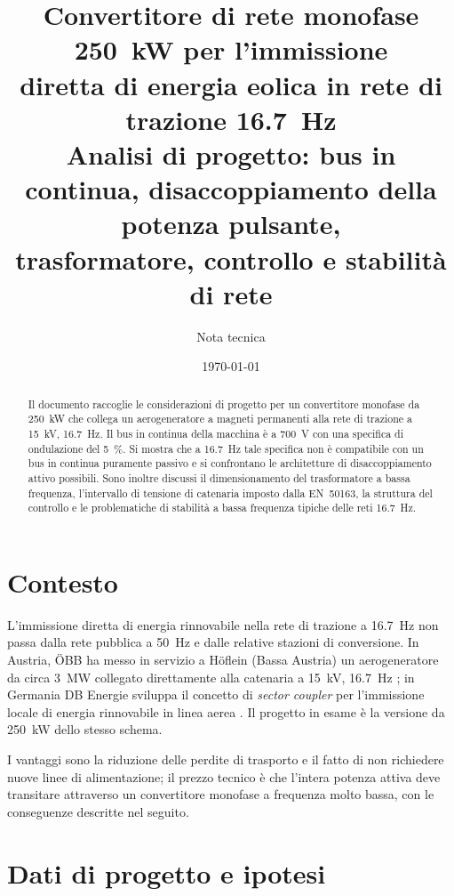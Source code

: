 \documentclass[11pt,a4paper]{article}
\title{Convertitore di rete monofase \SI{250}{\kilo\watt} per l'immissione\\
diretta di energia eolica in rete di trazione \SI{16.7}{\hertz}\\[2mm]
\large Analisi di progetto: bus in continua, disaccoppiamento della potenza pulsante,\\
trasformatore, controllo e stabilità di rete}
\author{Nota tecnica}
\date{\today}
\begin{document}
\maketitle

\begin{abstract}
\noindent
Il documento raccoglie le considerazioni di progetto per un convertitore monofase da
\SI{250}{\kilo\watt} che collega un aerogeneratore a magneti permanenti alla rete di
trazione a \SI{15}{\kilo\volt}, \SI{16.7}{\hertz}. Il bus in continua della macchina è
a \SI{700}{\volt} con una specifica di ondulazione del \SI{5}{\percent}. Si mostra che a
\SI{16.7}{\hertz} tale specifica non è compatibile con un bus in continua puramente
passivo e si confrontano le architetture di disaccoppiamento attivo possibili. Sono
inoltre discussi il dimensionamento del trasformatore a bassa frequenza, l'intervallo
di tensione di catenaria imposto dalla EN~50163, la struttura del controllo e le
problematiche di stabilità a bassa frequenza tipiche delle reti \SI{16.7}{\hertz}.
\end{abstract}

\section{Contesto}

L'immissione diretta di energia rinnovabile nella rete di trazione a \SI{16.7}{\hertz}
non passa dalla rete pubblica a \SI{50}{\hertz} e dalle relative stazioni di
conversione. In Austria, ÖBB ha messo in servizio a Höflein (Bassa Austria) un
aerogeneratore da circa \SI{3}{\mega\watt} collegato direttamente alla catenaria a
\SI{15}{\kilo\volt}, \SI{16.7}{\hertz} \cite{oebb_hoeflein}; in Germania DB Energie
sviluppa il concetto di \emph{sector coupler} per l'immissione locale di energia
rinnovabile in linea aerea \cite{db_tuebingen}. Il progetto in esame è la versione da
\SI{250}{\kilo\watt} dello stesso schema.

I vantaggi sono la riduzione delle perdite di trasporto e il fatto di non richiedere
nuove linee di alimentazione; il prezzo tecnico è che l'intera potenza attiva deve
transitare attraverso un convertitore monofase a frequenza molto bassa, con le
conseguenze descritte nel seguito.

\section{Dati di progetto e ipotesi}
\end{document}
